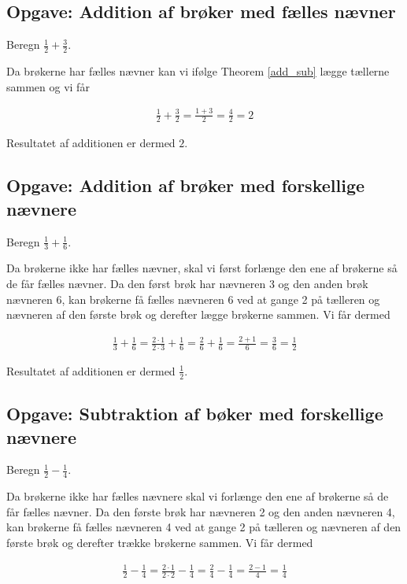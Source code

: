 \subsection{Opgave: Addition af brøker med fælles nævner}
Beregn $\frac{1}{2} + \frac{3}{2}$.

Da brøkerne har fælles nævner kan vi ifølge Theorem \ref{add_sub} lægge tællerne sammen og vi får

\begin{align*}
\frac{1}{2} + \frac{3}{2} = \frac{1 + 3}{2} = \frac{4}{2} = 2
\end{align*}

Resultatet af additionen er dermed $2$.

\subsection{Opgave: Addition af brøker med forskellige nævnere}
Beregn $\frac{1}{3} + \frac{1}{6}$.

Da brøkerne ikke har fælles nævner, skal vi først forlænge den ene af brøkerne så de får fælles nævner. Da den først brøk har nævneren 3 og den anden brøk nævneren 6, kan brøkerne få fælles nævneren 6 ved at gange 2 på tælleren og nævneren af den første brøk og derefter lægge brøkerne sammen. Vi får dermed

\begin{align*}
\frac{1}{3} + \frac{1}{6} = \frac{2\cdot 1}{2\cdot 3} + \frac{1}{6} = \frac{2}{6} + \frac{1}{6} = \frac{2 + 1}{6} = \frac{3}{6} = \frac{1}{2}
\end{align*}

Resultatet af additionen er dermed $\frac{1}{2}$.

\subsection{Opgave: Subtraktion af bøker med forskellige nævnere}
Beregn $\frac{1}{2} - \frac{1}{4}$.

Da brøkerne ikke har fælles nævnere skal vi forlænge den ene af brøkerne så de får fælles nævner. Da den første brøk har nævneren 2 og den anden nævneren 4, kan brøkerne få fælles nævneren 4 ved at gange 2 på tælleren og nævneren af den første brøk og derefter trække brøkerne sammen. Vi får dermed

\begin{align*}
\frac{1}{2} - \frac{1}{4} = \frac{2\cdot 1}{2\cdot 2} - \frac{1}{4} = \frac{2}{4} - \frac{1}{4} = \frac{2 - 1}{4} = \frac{1}{4}
\end{align*}

